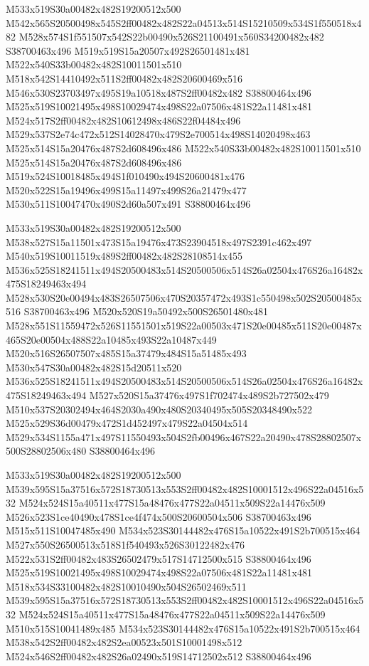 \documentclass{article}
\begin{document}
\begin{multicols}{2}
M533x519S30a00482x482S19200512x500 M542x565S20500498x545S2ff00482x482S22a04513x514S15210509x534S1f550518x482 M528x574S1f551507x542S22b00490x526S21100491x560S34200482x482 S38700463x496 M519x519S15a20507x492S26501481x481 M522x540S33b00482x482S10011501x510 M518x542S14410492x511S2ff00482x482S20600469x516 M546x530S23703497x495S19a10518x487S2ff00482x482 S38800464x496 M525x519S10021495x498S10029474x498S22a07506x481S22a11481x481 M524x517S2ff00482x482S10612498x486S22f04484x496 M529x537S2e74c472x512S14028470x479S2e700514x498S14020498x463 M525x514S15a20476x487S2d608496x486 M522x540S33b00482x482S10011501x510 M525x514S15a20476x487S2d608496x486 M519x524S10018485x494S1f010490x494S20600481x476 M520x522S15a19496x499S15a11497x499S26a21479x477 M530x511S10047470x490S2d60a507x491 S38800464x496

M533x519S30a00482x482S19200512x500 M538x527S15a11501x473S15a19476x473S23904518x497S2391c462x497 M540x519S10011519x489S2ff00482x482S28108514x455 M536x525S18241511x494S20500483x514S20500506x514S26a02504x476S26a16482x475S18249463x494 M528x530S20e00494x483S26507506x470S20357472x493S1c550498x502S20500485x516 S38700463x496 M520x520S19a50492x500S26501480x481 M528x551S11559472x526S11551501x519S22a00503x471S20e00485x511S20e00487x465S20e00504x488S22a10485x493S22a10487x449 M520x516S26507507x485S15a37479x484S15a51485x493 M530x547S30a00482x482S15d20511x520 M536x525S18241511x494S20500483x514S20500506x514S26a02504x476S26a16482x475S18249463x494 M527x520S15a37476x497S1f702474x489S2b727502x479 M510x537S20302494x464S2030a490x480S20340495x505S20348490x522 M525x529S36d00479x472S1d452497x479S22a04504x514 M529x534S1155a471x497S11550493x504S2fb00496x467S22a20490x478S28802507x500S28802506x480 S38800464x496

M533x519S30a00482x482S19200512x500 M539x595S15a37516x572S18730513x553S2ff00482x482S10001512x496S22a04516x532 M524x524S15a40511x477S15a48476x477S22a04511x509S22a14476x509 M526x523S1ce40490x478S1ce4f474x500S20600504x506 S38700463x496 M515x511S10047485x490 M534x523S30144482x476S15a10522x491S2b700515x464 M527x550S26500513x518S1f540493x526S30122482x476 M522x531S2ff00482x483S26502479x517S14712500x515 S38800464x496 M525x519S10021495x498S10029474x498S22a07506x481S22a11481x481 M518x534S33100482x482S10010490x504S26502469x511 M539x595S15a37516x572S18730513x553S2ff00482x482S10001512x496S22a04516x532 M524x524S15a40511x477S15a48476x477S22a04511x509S22a14476x509 M510x515S10041489x485 M534x523S30144482x476S15a10522x491S2b700515x464 M538x542S2ff00482x482S2ea00523x501S10001498x512 M524x546S2ff00482x482S26a02490x519S14712502x512 S38800464x496


\end{multicols}
\end{document}
